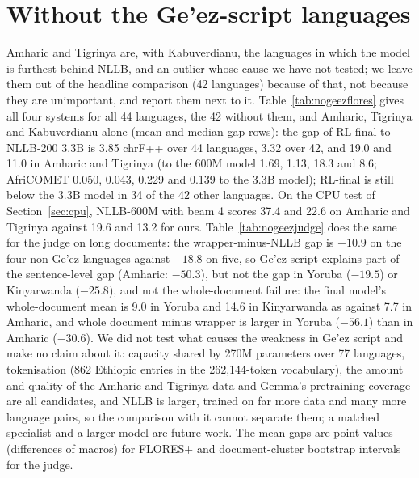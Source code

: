 \section{Without the Ge'ez-script languages}\label{app:geez}
Amharic and Tigrinya are, with Kabuverdianu, the languages in which the model is furthest behind NLLB, and an outlier whose cause we have not tested; we leave them out of the headline comparison (42 languages) because of that, not because they are unimportant, and report them next to it. Table~\ref{tab:nogeezflores} gives all four systems for all 44 languages, the 42 without them, and Amharic, Tigrinya and Kabuverdianu alone (mean and median gap rows): the gap of RL-final to NLLB-200 3.3B is 3.85 chrF++ over 44 languages, 3.32 over 42, and 19.0 and 11.0 in Amharic and Tigrinya (to the 600M model 1.69, 1.13, 18.3 and 8.6; AfriCOMET 0.050, 0.043, 0.229 and 0.139 to the 3.3B model); RL-final is still below the 3.3B model in 34 of the 42 other languages. On the CPU test of Section~\ref{sec:cpu}, NLLB-600M with beam 4 scores 37.4 and 22.6 on Amharic and Tigrinya against 19.6 and 13.2 for ours. Table~\ref{tab:nogeezjudge} does the same for the judge on long documents: the wrapper-minus-NLLB gap is $-10.9$ on the four non-Ge'ez languages against $-18.8$ on five, so Ge'ez script explains part of the sentence-level gap (Amharic: $-50.3$), but not the gap in Yoruba ($-19.5$) or Kinyarwanda ($-25.8$), and not the whole-document failure: the final model's whole-document mean is 9.0 in Yoruba and 14.6 in Kinyarwanda as against 7.7 in Amharic, and whole document minus wrapper is larger in Yoruba ($-56.1$) than in Amharic ($-30.6$). We did not test what causes the weakness in Ge'ez script and make no claim about it: capacity shared by 270M parameters over 77 languages, tokenisation (862 Ethiopic entries in the 262,144-token vocabulary), the amount and quality of the Amharic and Tigrinya data and Gemma's pretraining coverage are all candidates, and NLLB is larger, trained on far more data and many more language pairs, so the comparison with it cannot separate them; a matched specialist and a larger model are future work. The mean gaps are point values (differences of macros) for FLORES+ and document-cluster bootstrap intervals for the judge.

